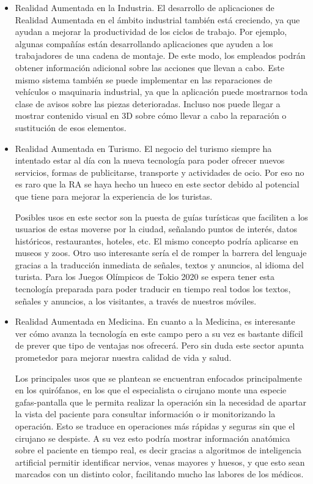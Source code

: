 \begin{itemize}
    \item Realidad Aumentada en la Industria. El desarrollo de aplicaciones de Realidad Aumentada en el ámbito industrial también está creciendo, ya que ayudan a mejorar la productividad de los ciclos de trabajo. Por ejemplo, algunas compañías están desarrollando aplicaciones que ayuden a los trabajadores de una cadena de montaje. De este modo, los empleados podrán obtener información adicional sobre las acciones que llevan a cabo. Este mismo sistema también se puede implementar en las reparaciones de vehículos o maquinaria industrial, ya que la aplicación puede mostrarnos toda clase de avisos sobre las piezas deterioradas. Incluso nos puede llegar a mostrar contenido visual en 3D sobre cómo llevar a cabo la reparación o sustitución de esos elementos. 
    

    \item Realidad Aumentada en Turismo. El negocio del turismo siempre ha intentado estar al día con la nueva tecnología para poder ofrecer nuevos servicios, formas de publicitarse, transporte y actividades de ocio. Por eso no es raro que la RA se haya hecho un hueco en este sector debido al potencial que tiene para mejorar la experiencia de los turistas. 
    
    Posibles usos en este sector son la puesta de guías turísticas que faciliten a los usuarios de estas moverse por la ciudad, señalando puntos de interés, datos históricos, restaurantes, hoteles, etc. El mismo concepto podría aplicarse en museos y zoos. Otro uso interesante sería el de romper la barrera del lenguaje gracias a la traducción inmediata de señales, textos y anuncios, al idioma del turista. Para los Juegos Olímpicos de Tokio 2020 se espera tener esta tecnología preparada para poder traducir en tiempo real todos los textos, señales y anuncios, a los visitantes, a través de nuestros móviles.   

    

    \item Realidad Aumentada en Medicina. En cuanto a la Medicina, es interesante ver cómo avanza la tecnología en este campo pero a su vez es bastante difícil de prever que tipo de ventajas nos ofrecerá. Pero sin duda este sector apunta prometedor para mejorar nuestra calidad de vida y salud.
    
    Los principales usos que se plantean se encuentran enfocados principalmente en los quirófanos, en los que el especialista o cirujano monte una especie gafas-pantalla que le permita realizar la operación sin la necesidad de apartar la vista del paciente para consultar información o ir monitorizando la operación. Esto se traduce en operaciones más rápidas y seguras sin que el cirujano se despiste. A su vez esto podría mostrar información anatómica sobre el paciente en tiempo real, es decir gracias a algoritmos de inteligencia artificial permitir identificar nervios, venas mayores y huesos, y que esto sean marcados con un distinto color, facilitando mucho las labores de los médicos.

\end{itemize}

